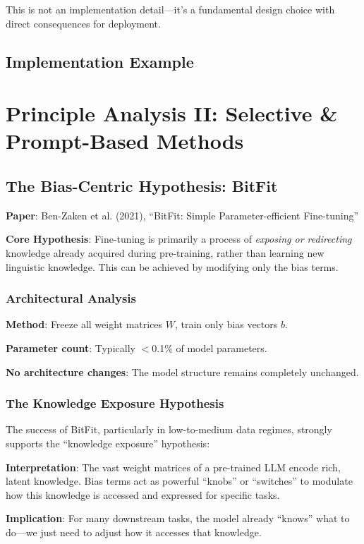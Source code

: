 \documentclass{article}
\begin{document}
This is not an implementation detail---it's a fundamental design choice with direct consequences for deployment.

\subsection{Implementation Example}


\section{Principle Analysis II: Selective \& Prompt-Based Methods}

\subsection{The Bias-Centric Hypothesis: BitFit}

\textbf{Paper}: Ben-Zaken et al. (2021), ``BitFit: Simple Parameter-efficient Fine-tuning''

\textbf{Core Hypothesis}: Fine-tuning is primarily a process of \textit{exposing or redirecting} knowledge already acquired during pre-training, rather than learning new linguistic knowledge. This can be achieved by modifying only the bias terms.

\subsubsection{Architectural Analysis}

\textbf{Method}: Freeze all weight matrices $W$, train only bias vectors $b$.

\textbf{Parameter count}: Typically $<$0.1\% of model parameters.

\textbf{No architecture changes}: The model structure remains completely unchanged.

\subsubsection{The Knowledge Exposure Hypothesis}

\begin{tcolorbox}[colback=purple!5!white, colframe=purple!75!black, title=Surprising Effectiveness of BitFit]
The success of BitFit, particularly in low-to-medium data regimes, strongly supports the ``knowledge exposure'' hypothesis:

\textbf{Interpretation}: The vast weight matrices of a pre-trained LLM encode rich, latent knowledge. Bias terms act as powerful ``knobs'' or ``switches'' to modulate how this knowledge is accessed and expressed for specific tasks.

\textbf{Implication}: For many downstream tasks, the model already ``knows'' what to do---we just need to adjust how it accesses that knowledge.
\end{tcolorbox}
\end{document}
